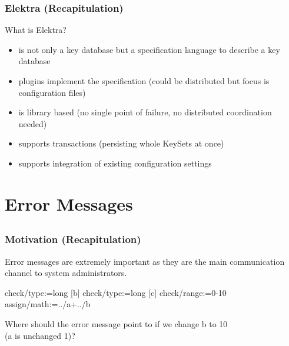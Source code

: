 \begin{frame}
	\frametitle{Elektra (Recapitulation)}

	\begin{task}
	What is Elektra?
	\end{task}

	\pause

	\begin{itemize}
	\item is not only a key database but a specification language to describe a key database
	\item plugins implement the specification (could be distributed but focus is configuration files)
	\item is library based (no single point of failure, no distributed coordination needed)
	\item supports transactions (persisting whole KeySets at once)
	\item supports integration of existing configuration settings
	\end{itemize}
\end{frame}



\section{Error Messages}

\subsection{}

\begin{frame}[fragile]
	\frametitle{Motivation (Recapitulation)}

	Error messages are extremely important as they are the main communication channel to system administrators.\\
	\vspace{0.5em}

	\begin{code}[morekeywords={assign,math},gobble=4]
	[a]
	  check/type:=long
	[b]
	  check/type:=long
	[c]
	  check/range:=0-10
	  assign/math:=../a+../b
	\end{code}

	\begin{task}
	Where should the error message point to if we change b to 10 \\ (a is unchanged 1)?
	\end{task}
\end{frame}

